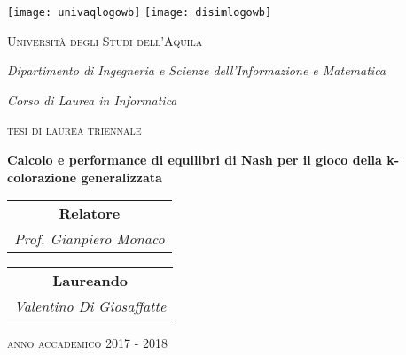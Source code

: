 \begin{titlepage}

\begin{center}

\texttt{[image: univaqlogowb]}
\hfill
\texttt{[image: disimlogowb]}

\vspace{1.5cm}

{\scshape\Large Università degli Studi dell'Aquila \\}

\vspace{0.5cm}

{\itshape\large Dipartimento di Ingegneria e Scienze dell'Informazione e Matematica \\}

\vspace{0.5cm}

{\itshape\large Corso di Laurea in Informatica \\}

\vspace{1cm}

{\scshape\Large tesi di laurea triennale \\}

\vspace{1cm}

{\huge\bfseries Calcolo e performance di equilibri di Nash per il gioco della k-colorazione generalizzata \\}

\vfill

\begin{tabular}{c}

	\textbf{Relatore} \\
	\textit{Prof. Gianpiero Monaco}

\end{tabular}
\hfill
\begin{tabular}{c}

	\textbf{Laureando}\\
	\textit{Valentino Di Giosaffatte}

\end{tabular}

\vfill

{\scshape\Large anno accademico }{\scshape\large 2017 - 2018}


\end{center}

\end{titlepage}
